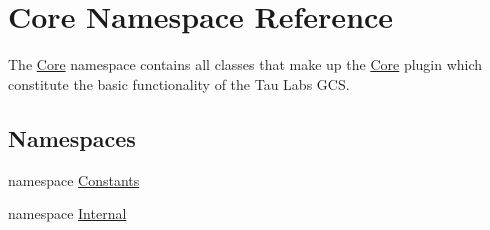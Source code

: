 \hypertarget{namespace_core}{\section{Core Namespace Reference}
\label{namespace_core}
}


The \hyperlink{namespace_core}{Core} namespace contains all classes that make up the \hyperlink{namespace_core}{Core} plugin which constitute the basic functionality of the Tau Labs G\-C\-S.  


\subsection*{Namespaces}
\begin{DoxyCompactItemize}
\item 
namespace \hyperlink{namespace_core_1_1_constants}{Constants}
\item 
namespace \hyperlink{namespace_core_1_1_internal}{Internal}
\end{DoxyCompactItemize}
